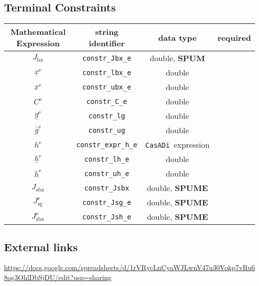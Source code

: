 \documentclass{article}
\newcommand{\code}[1]{\texttt{#1}}
\newcommand{\casadi}{\texttt{CasADi}}
\newcommand{\ind}[1]{_{\textrm{#1}}}
\newcommand{\terminal}{^{\textrm{e}}}
\begin{document}
\subsection{Terminal Constraints}
\begin{table}[h]
	\centering
	\begin{tabular}{|c|c|c|c|}
		\toprule
		Mathematical Expression & string identifier & data type  & required \\ \midrule
		$J_{\textrm{bx}}$ & \code{constr\_Jbx\_e}    & double, \textbf{SPUM}   & \optional   \\
		$\underline{x}\terminal $    & \code{constr\_lbx\_e}     & double  & \optional   \\
		$\bar{x}\terminal $         & \code{constr\_ubx\_e}     & double   & \optional  \\ \midrule
		$ C\terminal $ & \code{constr\_C\_e}    & double   & \optional   \\
		$\underline{g}\terminal $    & \code{constr\_lg}     & double   & \optional   \\
		$\bar{g}\terminal $         & \code{constr\_ug}     & double   & \optional  \\ \midrule
		$ h\terminal $ & \code{constr\_expr\_h\_e}    & \casadi~expression   & \optional  \\
		$\underline{h}\terminal $    & \code{constr\_lh\_e}     & double   & \optional   \\
		$\bar{h}\terminal $         & \code{constr\_uh\_e}     & double  & \optional   \\ \midrule
		$ J\ind{sbx} $ & \code{constr\_Jsbx} & double, \textbf{SPUME}   & \optional \\
		$ J\ind{sg}\terminal $ & \code{constr\_Jsg\_e} & double, \textbf{SPUME} & \optional  \\
		$ J\ind{sbx}\terminal $ & \code{constr\_Jsh\_e} & double, \textbf{SPUME}  & \optional  \\
		\bottomrule
	\end{tabular}
\end{table}

\subsection{External links}
\url{https://docs.google.com/spreadsheets/d/1rVRycLnCyaWJLwnV47u30Vokp7vRu68og3OhlDbSjDU/edit?usp=sharing}
\end{document}
